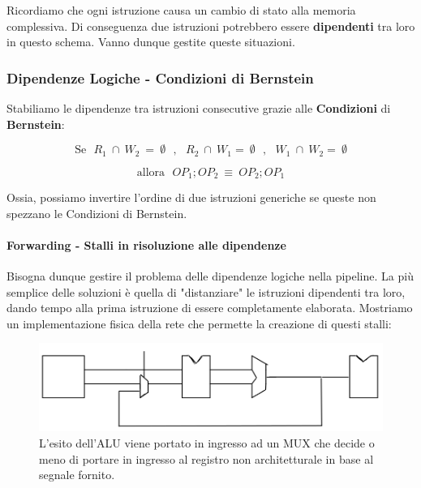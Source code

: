 \documentclass{article}
\begin{document}
\vspace*{15px}

Ricordiamo che ogni istruzione causa un cambio di stato alla memoria complessiva. Di conseguenza due istruzioni potrebbero essere \textbf{dipendenti} tra loro in questo schema. Vanno dunque gestite queste situazioni.

\newpage

\subsubsection{Dipendenze Logiche - Condizioni di Bernstein}

Stabiliamo le dipendenze tra istruzioni consecutive grazie alle \textbf{Condizioni} di \textbf{Bernstein}:

\[ \text{Se} \:\:\: R_{1} \: \cap \: W_{2} \:  = \: \emptyset \:\:\: , \:\:\: R_{2} \: \cap \: W_{1} = \: \emptyset \:\:\: , \:\:\: W_{1} \: \cap \: W_{2} = \: \emptyset \]

\vspace*{-10px}

\[ \text{allora}  \:\:\: OP_{1};OP_{2} \: \equiv \: OP_{2};OP_{1} \]

Ossia, possiamo invertire l'ordine di due istruzioni generiche se queste non spezzano le Condizioni di Bernstein.

\paragraph{Forwarding - Stalli in risoluzione alle dipendenze} Bisogna dunque gestire il problema delle dipendenze logiche nella pipeline. La più semplice delle soluzioni è quella di "distanziare" le istruzioni dipendenti tra loro, dando tempo alla prima istruzione di essere completamente elaborata. Mostriamo un implementazione fisica della rete che permette la creazione di questi stalli:

\begin{figure}[htbp]
    \center
    \includegraphics[scale=0.375]{img/forwarding.png}
    \caption{L'esito dell'ALU viene portato in ingresso ad un MUX che decide o meno di portare in ingresso al registro non architetturale in base al segnale fornito.}
\end{figure}
\end{document}
